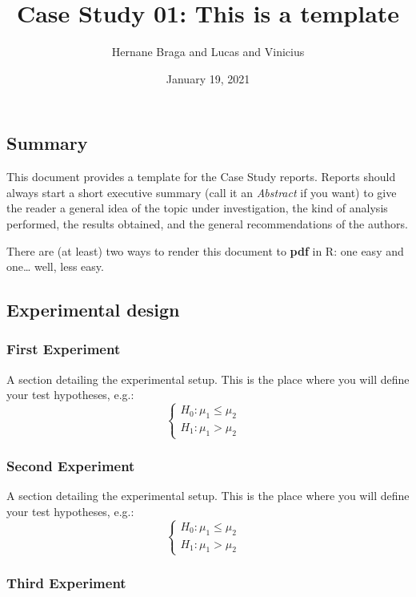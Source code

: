 \documentclass[
]{article}
\title{Case Study 01: This is a template}
\author{Hernane Braga and Lucas and Vinicius}
\date{January 19, 2021}
\begin{document}
\maketitle

\hypertarget{summary}{%
\subsection{Summary}\label{summary}}

This document provides a template for the Case Study reports. Reports
should always start a short executive summary (call it an
\emph{Abstract} if you want) to give the reader a general idea of the
topic under investigation, the kind of analysis performed, the results
obtained, and the general recommendations of the authors.

There are (at least) two ways to render this document to \textbf{pdf} in
R: one easy and one\ldots{} well, less easy.

\hypertarget{experimental-design}{%
\subsection{Experimental design}\label{experimental-design}}

\hypertarget{first-experiment}{%
\subsubsection{First Experiment}\label{first-experiment}}

A section detailing the experimental setup. This is the place where you
will define your test hypotheses, e.g.:
\[\begin{cases} H_0: \mu_1 \leq \mu_2&\\H_1: \mu_1 > \mu_2\end{cases}\]

\hypertarget{second-experiment}{%
\subsubsection{Second Experiment}\label{second-experiment}}

A section detailing the experimental setup. This is the place where you
will define your test hypotheses, e.g.:
\[\begin{cases} H_0: \mu_1 \leq \mu_2&\\H_1: \mu_1 > \mu_2\end{cases}\]

\hypertarget{third-experiment}{%
\subsubsection{Third Experiment}\label{third-experiment}}
\end{document}

